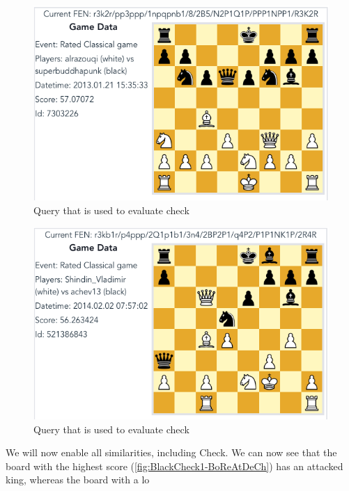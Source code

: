 \documentclass[11pt]{article}
\begin{document}
    \begin{figure}[H]
        \centering
        \includegraphics[width=14cm]{images/BlackCheck1-BoReAtDe}
        \caption{Query that is used to evaluate check}
        \label{fig:BlackCheck1-BoReAtDe}
    \end{figure}

    \begin{figure}[H]
        \centering
        \includegraphics[width=14cm]{images/BlackCheck2-BoReAtDe}
        \caption{Query that is used to evaluate check}
        \label{fig:BlackCheck2-BoReAtDe}
    \end{figure}

    We will now enable all similarities, including Check. We can now see that the board with the highest score (\ref{fig:BlackCheck1-BoReAtDeCh}) has an attacked king, whereas the board with a lo
\end{document}
